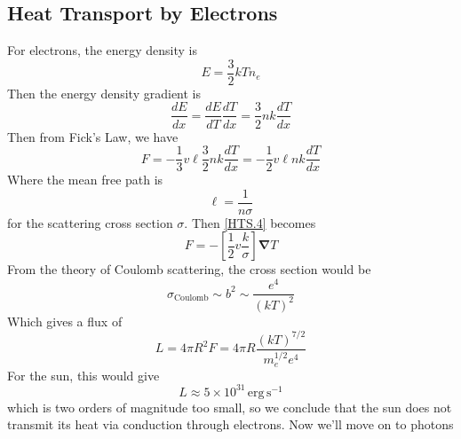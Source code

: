 \documentclass[10pt]{article}
\numberwithin{equation}{section}
\begin{document}
	\subsection{Heat Transport by Electrons} For electrons, the energy density is
	\begin{equation}
		\label{HTS.2} E=\frac{3}{2} kT n_e
	\end{equation}
	Then the energy density gradient is
	\begin{equation}
		\label{HTS.3} \frac{dE}{dx}=\frac{dE}{dT}\frac{dT}{dx}=\frac{3}{2}nk\frac{dT}{dx}
	\end{equation}
	Then from Fick's Law, we have
	\begin{equation}
		\label{HTS.4} F=-\frac{1}{3}v\ell\frac{3}{2}nk\frac{dT}{dx}=-\frac{1}{2}v\ell nk\frac{dT}{dx}
	\end{equation}
	Where the mean free path is
	\begin{equation}
		\label{HTS.5} \ell=\frac{1}{n\sigma}
	\end{equation}
	for the scattering cross section $\sigma$. Then \eqref{HTS.4} becomes
	\begin{equation}
		\label{HTS.6} F=-\left[\frac{1}{2} v\frac{k}{\sigma}\right]\bm{\nabla}T
	\end{equation}
	From the theory of Coulomb scattering, the cross section would be
	\begin{equation}
		\label{HTS.7} \sigma_{\mathrm{Coulomb}}\sim b^2\sim\frac{e^4}{(kT)^2}
	\end{equation}
	Which gives a flux of
	\begin{equation}
		\label{HTS.8} L=4\pi R^2F=4\pi R\frac{(kT)^{7/2}}{m_e^{1/2}e^4}
	\end{equation}
	For the sun, this would give
	\begin{equation}
		\label{HTS.9} L\approx 5\times 10^{31}\,\mathrm{erg\,s^{-1}}
	\end{equation}
	which is two orders of magnitude too small, so we conclude that the sun does not transmit its heat via conduction through electrons. Now we'll move on to photons
\end{document}
